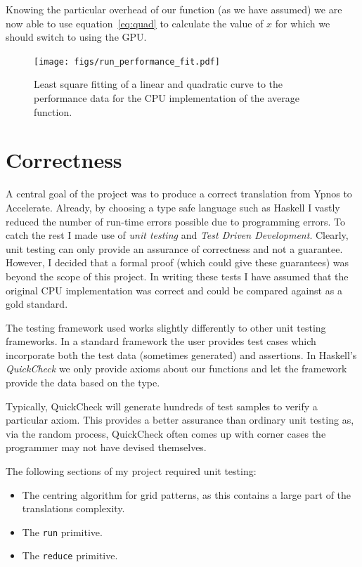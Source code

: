 \documentclass[12pt,a4paper,oneside]{scrbook}
\begin{document}
Knowing the particular overhead of our function (as we have assumed) we are now
able to use equation~\ref{eq:quad} to calculate the value of $x$ for which we
should switch to using the GPU.

\begin{figure}[h]
  \texttt{[image: figs/run\_performance\_fit.pdf]}
  \caption{Least square fitting of a linear and quadratic curve to the
    performance data for the CPU implementation of the average function.}
  \label{fig:fitting}
\end{figure}

\section{Correctness}

A central goal of the project was to produce a correct translation from
Ypnos to Accelerate. Already, by choosing a type safe language such as
Haskell I vastly reduced the number of run-time errors possible due to
programming errors. To catch the rest I made use of \emph{unit testing}
and \emph{Test Driven Development}. Clearly, unit testing can only
provide an assurance of correctness and not a guarantee. However, I
decided that a formal proof (which could give these guarantees) was
beyond the scope of this project. In writing these tests I have assumed
that the original CPU implementation was correct and could be compared
against as a gold standard.

The testing framework used works slightly differently to other unit testing
frameworks. In a standard framework the user provides test cases which
incorporate both the test data (sometimes generated) and assertions. In
Haskell's \emph{QuickCheck} we only provide axioms about our functions and let
the framework provide the data based on the type.

Typically, QuickCheck will generate hundreds of test samples to verify a
particular axiom. This provides a better assurance than ordinary unit
testing as, via the random process, QuickCheck often comes up with corner
cases the programmer may not have devised themselves.

The following sections of my project required unit testing:

\begin{itemize}
\item
  The centring algorithm for grid patterns, as this contains a large
  part of the translations complexity.
\item
  The \texttt{run} primitive.
\item
  The \texttt{reduce} primitive.
\end{itemize}
\end{document}
